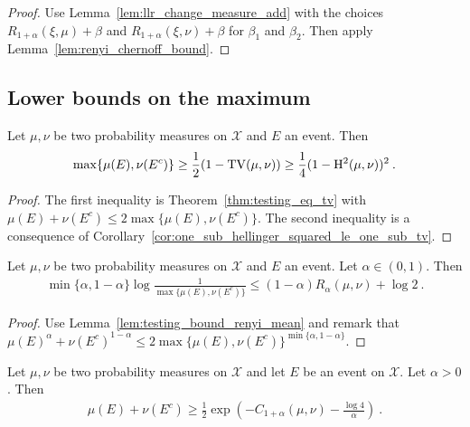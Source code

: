\begin{proof}\leanok
{}
Use Lemma~\ref{lem:llr_change_measure_add} with the choices $R_{1+\alpha}(\xi, \mu) + \beta$ and $R_{1+\alpha}(\xi, \nu) + \beta$ for $\beta_1$ and $\beta_2$.
Then apply Lemma~\ref{lem:renyi_chernoff_bound}.
\end{proof}


\subsection{Lower bounds on the maximum}

\begin{lemma}
  \label{lem:testing_bound_tv_hellinger_max}
  Let $\mu, \nu$ be two probability measures on $\mathcal X$ and $E$ an event. Then
  \begin{align*}
  \max\{\mu(E), \nu(E^c)\}
  \ge \frac{1}{2}(1 - \operatorname{TV}(\mu, \nu))
  \ge \frac{1}{4}(1 - \operatorname{H^2}(\mu, \nu))^2
  \: .
  \end{align*}
\end{lemma}

\begin{proof}
The first inequality is Theorem~\ref{thm:testing_eq_tv} with $\mu(E) + \nu(E^c) \le 2 \max\{\mu(E), \nu(E^c)\}$.
The second inequality is a consequence of Corollary~\ref{cor:one_sub_hellinger_squared_le_one_sub_tv}.
\end{proof}

\begin{lemma}
  \label{lem:testing_bound_renyi_max}
  Let $\mu, \nu$ be two probability measures on $\mathcal X$ and $E$ an event. Let $\alpha \in (0,1)$. Then
  \begin{align*}
  \min\{\alpha, 1 - \alpha\} \log\frac{1}{\max\{\mu(E), \nu(E^c)\}} \le (1 - \alpha) R_{\alpha}(\mu, \nu)  + \log 2 \: .
  \end{align*}
\end{lemma}

\begin{proof}
Use Lemma~\ref{lem:testing_bound_renyi_mean} and remark that $\mu(E)^\alpha + \nu(E^c)^{1 - \alpha} \le 2\max\{\mu(E), \nu(E^c)\}^{\min\{\alpha, 1 - \alpha\}}$.
\end{proof}


\begin{lemma}
  \label{lem:testing_bound_renyi_one_add}
  \leanok
  Let $\mu, \nu$ be two probability measures on $\mathcal X$ and let $E$ be an event on $\mathcal X$. Let $\alpha > 0$. Then
  \begin{align*}
  \mu(E) + \nu(E^c) \ge \frac{1}{2}\exp\left( - C_{1+\alpha}(\mu, \nu) - \frac{\log 4}{\alpha}\right) \: .
  \end{align*}
\end{lemma}

